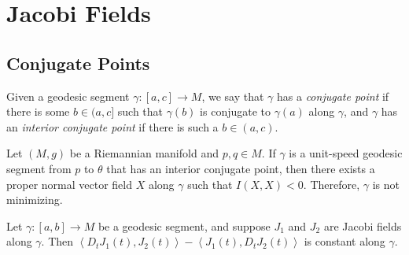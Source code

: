 \section{Jacobi Fields}
\label{section-Jacobi-fields}

\subsection{Conjugate Points}
\label{subsection-conjugate-points}

\begin{definition}
  \label{definition-conjugate-point}
  Given a geodesic segment \( \gamma: [a, c] \to M \), we say that \( \gamma \) has a \emph{conjugate point} if there is some \( b \in (a, c] \) such that \( \gamma(b) \) is conjugate to \( \gamma(a) \) along \( \gamma \), and \( \gamma \) has an \emph{interior conjugate point} if there is such a \( b \in (a, c) \).
\end{definition}

\begin{theorem}
  \label{theorem-index-form-less-than-0}
  Let \( (M, g) \) be a Riemannian manifold and \( p, q \in M \).
  If \( \gamma \) is a unit-speed geodesic segment from \( p \) to \( \theta \) that has an interior conjugate point, then there exists a proper normal vector field \( X \) along \( \gamma \) such that \( I(X, X) < 0 \).
  Therefore, \( \gamma \) is not minimizing.
\end{theorem}

\begin{lemma}
  \label{lemma-index-form-greater-than-or-equal-to-0}
  Let \( \gamma: [a, b] \to M \) be a geodesic segment, and suppose \( J_1 \) and \( J_2 \) are Jacobi fields along \( \gamma \).
  Then \( \left\langle D_t J_1(t), J_2(t) \right\rangle - \left\langle J_1(t), D_t J_2(t) \right\rangle \) is constant along \( \gamma \).
\end{lemma}

